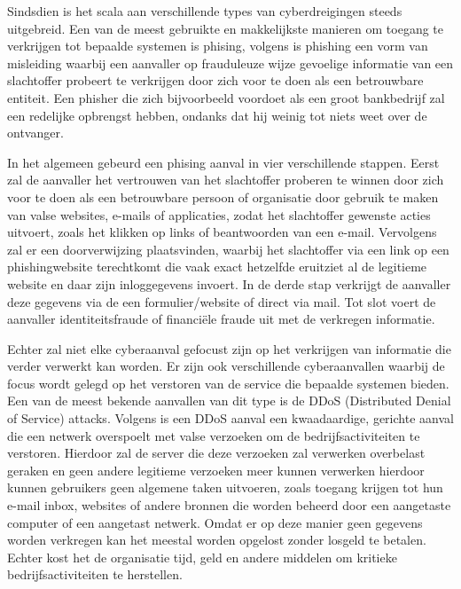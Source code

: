 Sindsdien is het scala aan verschillende types van cyberdreigingen steeds uitgebreid. Een van de meest gebruikte en makkelijkste manieren om toegang te verkrijgen tot bepaalde systemen is phising, volgens \textcite{jagatic2007} is phishing een vorm van misleiding waarbij een aanvaller op frauduleuze wijze gevoelige informatie van een slachtoffer probeert te verkrijgen door zich voor te doen als een betrouwbare entiteit. Een phisher die zich bijvoorbeeld voordoet als een groot bankbedrijf zal een redelijke opbrengst hebben, ondanks dat hij weinig tot niets weet over de ontvanger. 

In het algemeen gebeurd een phising aanval in vier verschillende stappen. Eerst zal de aanvaller het vertrouwen van het slachtoffer proberen te winnen door zich voor te doen als een betrouwbare persoon of organisatie door gebruik te maken van valse websites, e-mails of applicaties, zodat het slachtoffer gewenste acties uitvoert, zoals het klikken op links of beantwoorden van een e-mail. Vervolgens zal er een doorverwijzing plaatsvinden, waarbij het slachtoffer via een link op een phishingwebsite terechtkomt die vaak exact hetzelfde eruitziet al de legitieme website en daar zijn inloggegevens invoert. In de derde stap verkrijgt de aanvaller deze gegevens via de een formulier/website of direct via mail. Tot slot voert de aanvaller identiteitsfraude of financiële fraude uit met de verkregen informatie. \autocite{varshney2024}

Echter zal niet elke cyberaanval gefocust zijn op het verkrijgen van informatie die verder verwerkt kan worden. Er zijn ook verschillende cyberaanvallen waarbij de focus wordt gelegd op het verstoren van de service die bepaalde systemen bieden. Een van de meest bekende aanvallen van dit type is de DDoS (Distributed Denial of Service) attacks. Volgens \textcite{Baker2024} is een DDoS aanval een kwaadaardige, gerichte aanval die een netwerk overspoelt met valse verzoeken om de bedrijfsactiviteiten te verstoren. Hierdoor zal de server die deze verzoeken zal verwerken overbelast geraken en geen andere legitieme verzoeken meer kunnen verwerken hierdoor kunnen gebruikers geen algemene taken uitvoeren, zoals toegang krijgen tot hun e-mail inbox, websites of andere bronnen die worden beheerd door een aangetaste computer of een aangetast netwerk. Omdat er op deze manier geen gegevens worden verkregen kan het meestal worden opgelost zonder losgeld te betalen. Echter kost het de organisatie tijd, geld en andere middelen om kritieke bedrijfsactiviteiten te herstellen.

